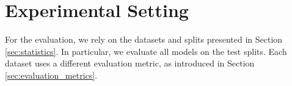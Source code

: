 \begin{table}[t]
\centering
{}
\caption{Number of tweets in the train, validation (Valid.) and test splits for each of the tasks in {\DATASET}.}
\label{tab:SuperTweetEval-data_distribution}
\end{table}


\section{Experimental Setting}
For the evaluation, we rely on the datasets and splits presented in Section \ref{sec:statistics}. In particular, we evaluate all models on the test splits. Each dataset uses a different evaluation metric, as introduced in Section \ref{sec:evaluation_metrics}.

